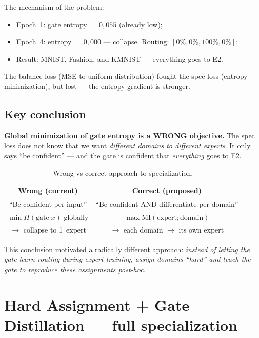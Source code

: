 \documentclass[11pt,a4paper]{report}
\begin{document}
The mechanism of the problem:
\begin{itemize}
    \item Epoch~1: gate entropy $= 0{,}055$ (already low);
    \item Epoch~4: entropy $= 0{,}000$ --- collapse. Routing: $[0\%, 0\%, 100\%, 0\%]$;
    \item Result: MNIST, Fashion, and KMNIST --- everything goes to E2.
\end{itemize}

The balance loss (MSE to uniform distribution) fought the spec loss (entropy minimization), but lost --- the entropy gradient is stronger.

\subsection{Key conclusion}

\textbf{Global minimization of gate entropy is a WRONG objective.} The spec loss does not know that we want \emph{different domains to different experts}. It only says ``be confident'' --- and the gate is confident that \emph{everything} goes to E2.

\begin{table}[h]
\centering
\caption{Wrong vs correct approach to specialization.}
\begin{tabular}{c c}
\hline
\textbf{Wrong (current)} & \textbf{Correct (proposed)} \\
\hline
``Be confident per-input'' & ``Be confident AND differentiate per-domain'' \\
$\min H(\text{gate}|x)$ globally & $\max \text{MI}(\text{expert};\text{domain})$ \\
$\to$ collapse to 1~expert & $\to$ each domain $\to$ its own expert \\
\hline
\end{tabular}
\end{table}

This conclusion motivated a radically different approach: \emph{instead of letting the gate learn routing during expert training, assign domains ``hard'' and teach the gate to reproduce these assignments post-hoc.}



\section{Hard Assignment + Gate Distillation --- full specialization}
\label{sec:hard_assign}
\end{document}
